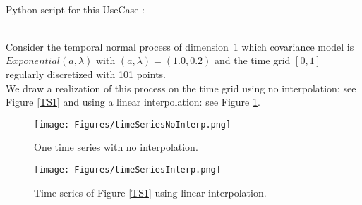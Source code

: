 \textspace\\
Python script for this UseCase :


\textspace\\
Consider the temporal normal process of dimension~1 which covariance model is $Exponential(a,\lambda)$ with $(a, \lambda)=(1.0, 0.2)$ and the  time grid $[0,1]$ regularly discretized with 101 points. \\
We draw  a realization of this process on the time grid using no interpolation: see  Figure \ref{TS1} and using a linear interpolation: see  Figure \ref{TS2}.


\begin{figure}[H]
  \begin{minipage}{9cm}
    \begin{center}
      \texttt{[image: Figures/timeSeriesNoInterp.png]}
      \caption{One time series with no interpolation.}
      \label{TS1}
    \end{center}
  \end{minipage}
  \hfill
  \begin{minipage}{9cm}
    \begin{center}
      \texttt{[image: Figures/timeSeriesInterp.png]}
      \caption{Time series of Figure \ref{TS1} using linear interpolation.}
      \label{TS2}
    \end{center}
  \end{minipage}
\end{figure}
